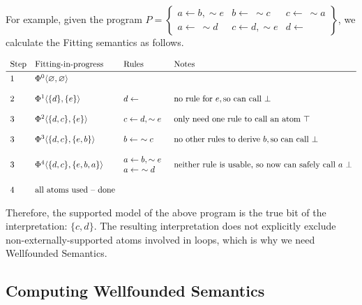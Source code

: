 \documentclass[9pt,a4paper,landscape]{article}
\begin{document}
{For example, given the program $P = \left\{\begin{array}{lll}
a \leftarrow b, \sim e & b \leftarrow\ \sim c & c \leftarrow\ \sim a \\
a \leftarrow\ \sim d & c \leftarrow d, \sim e & d \leftarrow
\end{array}\right\}$, we calculate the Fitting semantics as follows.

\begin{center}
	$\begin{array}{llll}
\text{Step} & \text{Fitting-in-progress} & \text{Rules} & \text{Notes} \\ \midrule
1 & \Phi^0 \langle \varnothing, \varnothing \rangle && \\&\\
2 & \Phi^1 \langle \{d\}, \{e\} \rangle & d \leftarrow & \text{no rule for}\ e, \text{so can call}\ \bot\\&\\
3 & \Phi^2 \langle \{d, c\}, \{e\} \rangle & c \leftarrow d, \sim e & \text{only need one rule to call an atom}\ \top \\&\\
3 & \Phi^3 \langle \{d, c\}, \{e, b\} \rangle & b \leftarrow\ \sim c & \text{no other rules to derive}\ b, \text{so can call}\ \bot \\&\\
3 & \Phi^4 \langle \{d, c\}, \{e, b, a\} \rangle & \begin{array}{@{}l}
a \leftarrow b, \sim e\\
a \leftarrow\ \sim d
\end{array} & \text{neither rule is usable, so now can safely call}\ a\ \bot \\ &\\
4 & \text{all atoms used -- done}
\end{array}$
\end{center}

Therefore, the supported model of the above program is the true bit of the interpretation: $\{c, d\}$.
The resulting interpretation does not explicitly exclude non-externally-supported atoms involved in loops, which is why we need Wellfounded Semantics.


\subsection{Computing Wellfounded Semantics}
\label{subsec:wellf-sem}

}
\end{document}
